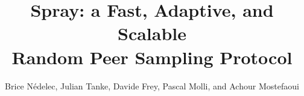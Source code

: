 \documentclass[conference]{sig-alternate}
\begin{document}
\title{Spray: a Fast, Adaptive, and Scalable\\Random Peer Sampling
  Protocol}

\author{Brice N{\'e}delec, Julian Tanke, Davide Frey, Pascal Molli, and Achour
  Mostefaoui%
}
\date{}

\maketitle












\clearpage
  
\end{document}
